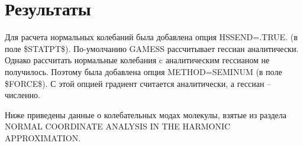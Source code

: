 \section{Результаты}
Для расчета нормальных колебаний была добавлена опция HSSEND=.TRUE. (в поле \$STATPT\$). По-умолчанию GAMESS рассчитывает гессиан аналитически. Однако рассчитать нормальные колебания c аналитическим гессианом не получилось. Поэтому была добавлена опция METHOD=SEMINUM (в поле \$FORCE\$). С этой опцией градиент считается аналитически, а гессиан -- численно.

Ниже приведены данные о колебательных модах молекулы, взятые из раздела NORMAL COORDINATE ANALYSIS IN THE HARMONIC APPROXIMATION.
\begin{table}[H]
    \caption{Нормальные колебания молекулы}
    \begin{center}
    \label{tab:my-table}
\end{center}
\end{table}
